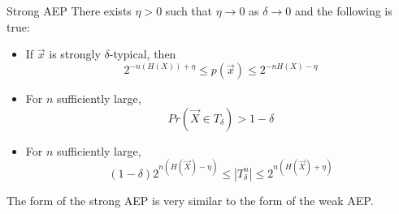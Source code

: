 \documentclass[../main.tex]{subfiles}
\begin{document}
\begin{bbox}{Strong AEP}
    There exists $\eta > 0$ such that $\eta \to 0$ as $\delta\to 0$ and the following is true:
    \begin{itemize}
        \item If $\vec x$ is strongly $\delta$-typical, then \[2^{-n(H(X))+\eta} \leq p(\vec x) \leq 2^{-nH(X)-\eta}
        \]
        \item For $n$ sufficiently large, \[
        Pr(\vec X \in T_\delta) > 1-\delta
        \]
        \item For $n$ sufficiently large, \[
        (1-\delta)2^{n(H(\vec X)-\eta)}\leq |T^{n}_\delta| \leq 2^{n(H(\vec X)+\eta)}
        \]
    \end{itemize}
    The form of the strong AEP is very similar to the form of the weak AEP.
\end{bbox}
\end{document}
